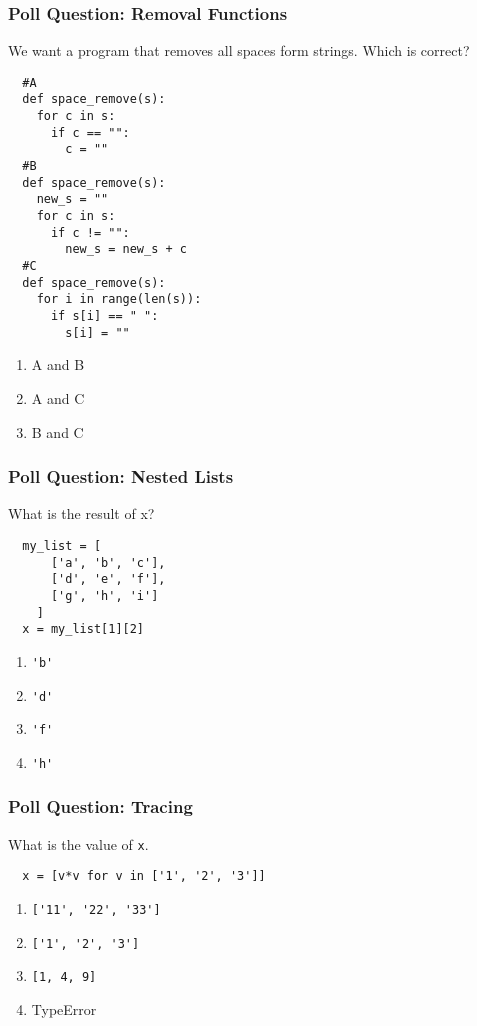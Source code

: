 \documentclass{beamer}
\begin{document}
%
%
\begin{frame}[fragile]
  \frametitle{Poll Question: Removal Functions}
  We want a program that removes all spaces form strings. Which is correct?\\
  \begin{minipage}{0.48\textwidth}
    \begin{lstlisting}
  #A
  def space_remove(s):
    for c in s:
      if c == "":
        c = ""
  #B
  def space_remove(s):
    new_s = ""
    for c in s:
      if c != "":
        new_s = new_s + c
  #C
  def space_remove(s):
    for i in range(len(s)):
      if s[i] == " ":
        s[i] = ""
    \end{lstlisting}
  \end{minipage}
  \hfill
  \begin{minipage}{0.48\textwidth}
    \hfill
    \begin{enumerate}[A]
      \item A and B
      \item A and C
      \item B and C
    \end{enumerate}
  \end{minipage}
\end{frame}


%
%
\begin{frame}[fragile]
  \frametitle{Poll Question: Nested Lists}
  What is the result of x?
  \begin{lstlisting}
  my_list = [
      ['a', 'b', 'c'],
      ['d', 'e', 'f'],
      ['g', 'h', 'i']
    ]
  x = my_list[1][2]
  \end{lstlisting}
  \vfill
  \begin{enumerate}[A]
    \item \lstinline|'b'|
    \item \lstinline|'d'|
    \item \lstinline|'f'|
    \item \lstinline|'h'|
  \end{enumerate}
\end{frame}

%
%
\begin{frame}[fragile]
  \frametitle{Poll Question: Tracing}
  What is the value of \lstinline|x|.
  \begin{lstlisting}
  x = [v*v for v in ['1', '2', '3']]
  \end{lstlisting}
  \vfill
  \begin{enumerate}[A]
    \item \lstinline|['11', '22', '33']| 
    \item \lstinline|['1', '2', '3']|
    \item \lstinline|[1, 4, 9]|
    \item TypeError
  \end{enumerate}
\end{frame}
\end{document}
